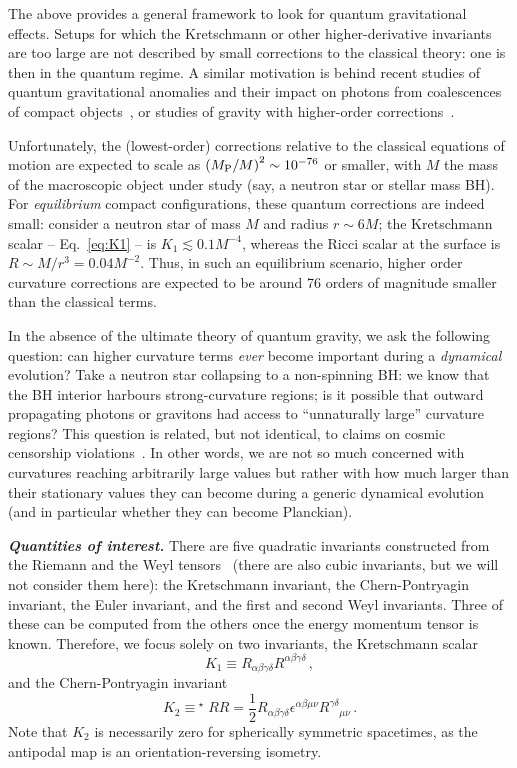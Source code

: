 \documentclass[floats,floatfix,showpacs,amssymb,prd,twocolumn,superscriptaddress,nofootinbib,nolongbibliography,reprint]{revtex4-2}
\begin{document}
The above provides a general framework to look for quantum gravitational effects.
Setups for which the Kretschmann or other higher-derivative invariants are too large are not described by small corrections to the classical theory: one is then in the quantum regime. A similar motivation is behind recent studies of quantum gravitational anomalies and their impact on photons from coalescences of compact objects~\cite{Agullo:2016lkj,delRio:2020cmv}, or studies of gravity with higher-order corrections~\cite{Cardoso:2018ptl}.


Unfortunately, the (lowest-order) corrections relative to the classical equations of motion are expected to scale as $\left(M_{\rm P}/M\right)^2 \sim 10^{-76}$ or smaller, with $M$ the mass of the macroscopic object under study (say, a neutron star or stellar mass BH). For {\it equilibrium} compact configurations, these quantum corrections are indeed small: consider a neutron star of mass $M$ and radius $r\sim 6M$; the Kretschmann scalar -- Eq.~\eqref{eq:K1} -- is $K_1\lesssim 0.1 M^{-4}$, whereas the Ricci scalar at the surface is $R\sim M/r^3=0.04M^{-2}$. Thus, in such an equilibrium scenario, higher order curvature corrections are expected to be around 76 orders of magnitude smaller than the classical terms.



In the absence of the ultimate theory of quantum gravity, we ask the following question: can higher curvature terms {\it ever} become important during a {\it dynamical} evolution? Take a neutron star collapsing to a non-spinning BH: we know that the BH interior harbours strong-curvature regions; is it possible that outward propagating photons or gravitons had access to ``unnaturally large'' curvature regions? This question is related, but not identical, to claims on cosmic censorship violations~\cite{Emparan:2020vyf}. In other words, we are not so much concerned with curvatures reaching arbitrarily large values but rather with how much larger than their stationary values they can become during a generic dynamical evolution (and in particular whether they can become Planckian).

\noindent
{\bf \em Quantities of interest.}
There are five quadratic invariants constructed from the Riemann and the Weyl tensors~\cite{Cherubini:2002gen} (there are also cubic invariants, but we will not consider them here): the Kretschmann invariant, the Chern-Pontryagin invariant, the Euler invariant, and the first and second Weyl invariants. Three of these can be computed from the others once the energy momentum tensor is known. Therefore, we focus solely on two invariants, the 
Kretschmann scalar
%
\begin{equation}
K_1 \equiv R_{\alpha\beta\gamma\delta} R^{\alpha\beta\gamma\delta}
\,,
\label{eq:K1}
\end{equation}
%
and the Chern-Pontryagin invariant
%
\begin{equation}
K_2 \equiv ^{\,\,\star\!\!}RR=\frac{1}{2}R_{\alpha\beta\gamma\delta} \epsilon^{\alpha\beta\mu\nu}R^{\gamma\delta}_{\quad\mu\nu} \,.
\label{eq:K2}
\end{equation}
%
Note that $K_2$ is necessarily zero for spherically symmetric spacetimes, as the antipodal map is an orientation-reversing isometry.
\end{document}

